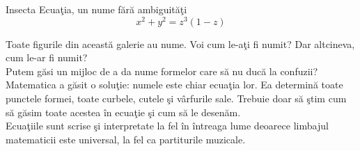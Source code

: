 \begin{surferPage}{Insecta}
Ecua\c tia, un nume f\u ar\u a ambiguit\u a\c ti\\
\smallskip
\[x^2 + y^2	= z^3	(1 - z) \]


\singlespacing
Toate figurile din aceast\u a galerie au nume. Voi cum le-a\c ti fi numit? Dar altcineva, cum le-ar fi numit?\\
\vspace{0.3cm}
Putem g\u asi un mijloc de a da nume formelor care s\u a nu duc\u a la confuzii? Matematica a g\u asit
o solu\c tie: numele este chiar ecua\c tia lor. Ea determin\u a toate punctele formei, toate curbele, cutele 
\c si v\^arfurile sale. Trebuie doar s\u a \c stim cum s\u a g\u asim toate acestea \^in ecua\c tie \c si 
cum s\u a le desen\u am.\\
\vspace{0.3cm}
Ecua\c tiile sunt scrise \c si interpretate la fel \^in \^intreaga lume deoarece limbajul matematicii este
universal, la fel ca partiturile muzicale.
\end{surferPage}